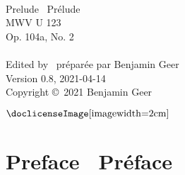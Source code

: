 \documentclass[a4paper, 12pt]{book}
\newcommand{\bigdot}[0]{{\Large \textbullet}}
\begin{document}
\frontmatter


\begin{titlepage}
\begin{center}
   \\
  \vspace{2cm}
  {\fontsize{32}{42}\selectfont Prelude \textbullet\ Prélude} \\
  \vspace{2 cm}
  {\fontsize{24}{34}\selectfont MWV U 123} \\
  \vspace{0.5 cm}
  {\fontsize{24}{34}\selectfont Op. 104a, No. 2} \\
  \vspace{4.6 cm}
  {\Large {}} \\
  \vspace{0.5 cm}
  {\Large Edited by \textbullet\ préparée par Benjamin Geer} \\
  \vspace{4.6 cm}
  {\footnotesize Version 0.8, 2021-04-14} \\
  \vspace{0.1 cm}
  {\footnotesize Copyright \copyright\ 2021 Benjamin Geer} \\
  \vspace{0.25 cm}
  \begin{minipage}{\textwidth}
  \centering
  $\vcenter{\hbox{\doclicenseImage[imagewidth=2cm]}}$
  \end{minipage}
  \end{center}
\end{titlepage}


\chapter*{Preface \bigdot\ Préface}
\end{document}
